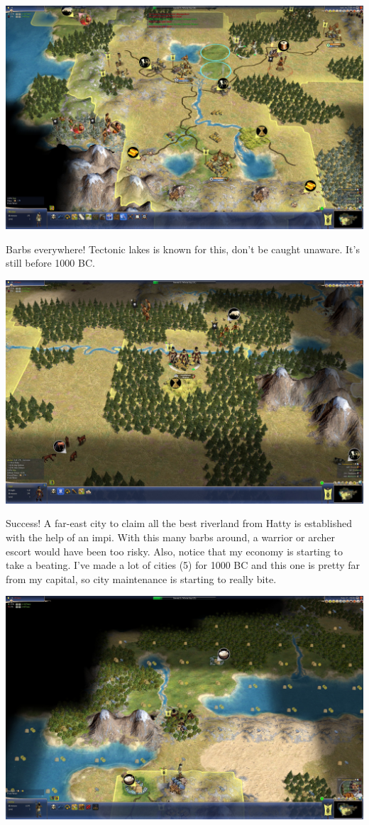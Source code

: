 \documentclass[10pt]{article}
\begin{document}
\includegraphics[width=1.0\textwidth]{39}

Barbs everywhere! Tectonic lakes is known for this, don't be caught unaware. It's still before 1000 BC.

\includegraphics[width=1.0\textwidth]{42}

Success! A far-east city to claim all the best riverland from Hatty is established with the help of
an impi. With this many barbs around, a warrior or archer escort would have been too risky. Also, notice
that my economy is starting to take a beating. I've made a lot of cities (5) for 1000 BC and this one is
pretty far from my capital, so city maintenance is starting to really bite.

\includegraphics[width=1.0\textwidth]{43}
\end{document}
